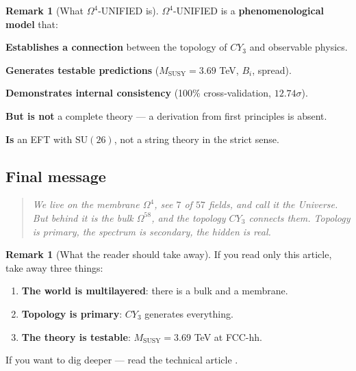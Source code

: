 \documentclass[11pt,a4paper]{article}
\newcommand{\SU}{\mathrm{SU}}
\newcommand{\CY}{CY_3}
\newcommand{\Om}{\Omega^4}
\newcommand{\Omfi}{\Omega^{58}}
\newcommand{\MSUSY}{M_{\text{SUSY}}}
\theoremstyle{definition}
\newtheorem{remark}[theorem]{Remark}
\begin{document}
\begin{remark}[What $\Om$-UNIFIED is]
\label{rem:conclusions-what-is}
$\Om$-UNIFIED is a \textbf{phenomenological model} that:

\medskip\noindent
\textbf{Establishes a connection} between the topology of $\CY$ and 
observable physics.

\medskip\noindent
\textbf{Generates testable predictions} 
($\MSUSY = 3.69$ TeV, $B_i$, spread).

\medskip\noindent
\textbf{Demonstrates internal consistency} 
(100\% cross-validation, $12.74\sigma$).

\medskip\noindent
\textbf{But is not} a complete theory — a derivation from first 
principles is absent.

\medskip\noindent
\textbf{Is} an EFT with $\SU(26)$, not a string theory 
in the strict sense.
\end{remark}

\subsection{Final message}
\label{subsec:conclusions-final-message}

\begin{quote}
\itshape
We live on the membrane $\Om$, see $7$ of $57$ fields, and 
call it the Universe. But behind it is the bulk $\Omfi$, and 
the topology $\CY$ connects them. Topology is primary, 
the spectrum is secondary, the hidden is real.
\end{quote}

\begin{remark}[What the reader should take away]
\label{rem:conclusions-takeaway}
If you read only this article, take away three things:
\begin{enumerate}
    \item \textbf{The world is multilayered}: there is a bulk and a membrane.
    \item \textbf{Topology is primary}: $\CY$ generates everything.
    \item \textbf{The theory is testable}: $\MSUSY = 3.69$ TeV 
          at FCC-hh.
\end{enumerate}
If you want to dig deeper — read the technical article 
\cite{matershov_omega4_2026}.
\end{remark}
\end{document}
